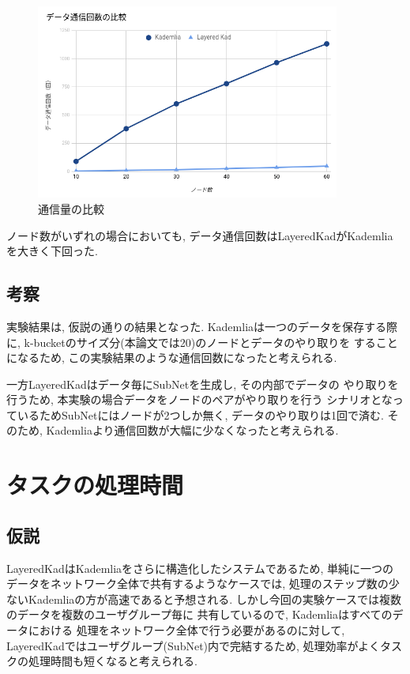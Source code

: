 \documentclass[sotsuron]{jcsie}
\begin{document}
\begin{figure}[H]	
	\centering
	\includegraphics[width=10cm]{./assets/image/traffic_graph.png}
	\caption{通信量の比較}
	\label{figure:traffic-3}
\end{figure}

ノード数がいずれの場合においても, データ通信回数はLayeredKadがKademlia
を大きく下回った.

\subsection{考察}
実験結果は, 仮説の通りの結果となった.
Kademliaは一つのデータを保存する際に, 
k-bucketのサイズ分(本論文では20)のノードとデータのやり取りを
することになるため, この実験結果のような通信回数になったと考えられる.

一方LayeredKadはデータ毎にSubNetを生成し, その内部でデータの
やり取りを行うため, 本実験の場合データをノードのペアがやり取りを行う
シナリオとなっているためSubNetにはノードが2つしか無く, 
データのやり取りは1回で済む.
そのため, Kademliaより通信回数が大幅に少なくなったと考えられる.

\section{タスクの処理時間}
\subsection{仮説}
LayeredKadはKademliaをさらに構造化したシステムであるため, 
単純に一つのデータをネットワーク全体で共有するようなケースでは, 
処理のステップ数の少ないKademliaの方が高速であると予想される.
しかし今回の実験ケースでは複数のデータを複数のユーザグループ毎に
共有しているので, Kademliaはすべてのデータにおける
処理をネットワーク全体で行う必要があるのに対して, 
LayeredKadではユーザグループ(SubNet)内で完結するため, 
処理効率がよくタスクの処理時間も短くなると考えられる.
\end{document}
